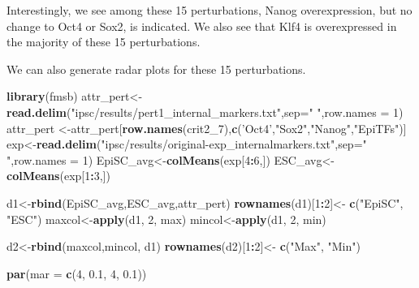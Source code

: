 \documentclass[
]{book}
\newenvironment{Shaded}{\begin{snugshade}}{\end{snugshade}}
\newcommand{\DataTypeTok}[1]{\textcolor[rgb]{0.13,0.29,0.53}{#1}}
\newcommand{\DecValTok}[1]{\textcolor[rgb]{0.00,0.00,0.81}{#1}}
\newcommand{\FloatTok}[1]{\textcolor[rgb]{0.00,0.00,0.81}{#1}}
\newcommand{\KeywordTok}[1]{\textcolor[rgb]{0.13,0.29,0.53}{\textbf{#1}}}
\newcommand{\NormalTok}[1]{#1}
\newcommand{\OperatorTok}[1]{\textcolor[rgb]{0.81,0.36,0.00}{\textbf{#1}}}
\newcommand{\StringTok}[1]{\textcolor[rgb]{0.31,0.60,0.02}{#1}}
\begin{document}
Interestingly, we see among these 15 perturbations, Nanog overexpression, but no change to Oct4 or Sox2, is indicated. We also see that Klf4 is overexpressed in the majority of these 15 perturbations.

We can also generate radar plots for these 15 perturbations.

\begin{Shaded}
\begin{Highlighting}[]
\KeywordTok{library}\NormalTok{(fmsb)}
\NormalTok{attr_pert<-}\KeywordTok{read.delim}\NormalTok{(}\StringTok{"ipsc/results/pert1_internal_markers.txt"}\NormalTok{,}\DataTypeTok{sep=}\StringTok{" "}\NormalTok{,}\DataTypeTok{row.names =} \DecValTok{1}\NormalTok{)}
\NormalTok{attr_pert <-attr_pert[}\KeywordTok{row.names}\NormalTok{(crit2_}\DecValTok{7}\NormalTok{),}\KeywordTok{c}\NormalTok{(}\StringTok{'Oct4'}\NormalTok{,}\StringTok{"Sox2"}\NormalTok{,}\StringTok{"Nanog"}\NormalTok{,}\StringTok{"EpiTFs"}\NormalTok{)]}
\NormalTok{exp<-}\KeywordTok{read.delim}\NormalTok{(}\StringTok{"ipsc/results/original-exp_internalmarkers.txt"}\NormalTok{,}\DataTypeTok{sep=}\StringTok{" "}\NormalTok{,}\DataTypeTok{row.names =} \DecValTok{1}\NormalTok{)}
\NormalTok{EpiSC_avg<-}\KeywordTok{colMeans}\NormalTok{(exp[}\DecValTok{4}\OperatorTok{:}\DecValTok{6}\NormalTok{,])}
\NormalTok{ESC_avg<-}\KeywordTok{colMeans}\NormalTok{(exp[}\DecValTok{1}\OperatorTok{:}\DecValTok{3}\NormalTok{,])}

\NormalTok{d1<-}\KeywordTok{rbind}\NormalTok{(EpiSC_avg,ESC_avg,attr_pert)}
\KeywordTok{rownames}\NormalTok{(d1)[}\DecValTok{1}\OperatorTok{:}\DecValTok{2}\NormalTok{]<-}\StringTok{ }\KeywordTok{c}\NormalTok{(}\StringTok{"EpiSC"}\NormalTok{, }\StringTok{"ESC"}\NormalTok{)}
\NormalTok{maxcol<-}\KeywordTok{apply}\NormalTok{(d1, }\DecValTok{2}\NormalTok{, max)}
\NormalTok{mincol<-}\KeywordTok{apply}\NormalTok{(d1, }\DecValTok{2}\NormalTok{, min)}

\NormalTok{d2<-}\KeywordTok{rbind}\NormalTok{(maxcol,mincol, d1)}
\KeywordTok{rownames}\NormalTok{(d2)[}\DecValTok{1}\OperatorTok{:}\DecValTok{2}\NormalTok{]<-}\StringTok{ }\KeywordTok{c}\NormalTok{(}\StringTok{"Max"}\NormalTok{, }\StringTok{"Min"}\NormalTok{)}

\KeywordTok{par}\NormalTok{(}\DataTypeTok{mar =} \KeywordTok{c}\NormalTok{(}\DecValTok{4}\NormalTok{, }\FloatTok{0.1}\NormalTok{, }\DecValTok{4}\NormalTok{, }\FloatTok{0.1}\NormalTok{))}


\end{Highlighting}
\end{Shaded}
\end{document}
